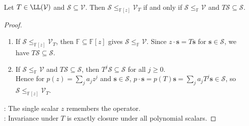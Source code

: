 \begin{theorem} \label{thm:operator-submodules-invariant-subspaces} \\
Let $T\in\LL(\mathcal{V})$ and $\mathcal{S}\subseteq\mathcal{V}$. Then $\mathcal{S}\leq_{\mathbb{F}[z]}\mathcal{V}_T$ if and only if $\mathcal{S}\leq_{\mathbb{F}}\mathcal{V}$ and $T\mathcal{S}\subseteq\mathcal{S}$.
\begin{proof}
\begin{enumerate}[label=\roman*.]
\setlength{\itemsep}{0pt}
\item[$(\Rightarrow)$] If $\mathcal{S}\leq_{\mathbb{F}[z]}\mathcal{V}_T$, then $\mathbb{F}\subseteq\mathbb{F}[z]$ gives $\mathcal{S}\leq_{\mathbb{F}}\mathcal{V}$. Since $z\cdot\mathbf{s}=T\mathbf{s}$ for $\mathbf{s}\in\mathcal{S}$, we have $T\mathcal{S}\subseteq\mathcal{S}$.
\item[$(\Leftarrow)$] If $\mathcal{S}\leq_{\mathbb{F}}\mathcal{V}$ and $T\mathcal{S}\subseteq\mathcal{S}$, then $T^j\mathcal{S}\subseteq\mathcal{S}$ for all $j\geq0$.\\
Hence for $p(z)=\sum_ja_jz^j$ and $\mathbf{s}\in\mathcal{S}$, $p\cdot\mathbf{s}=p(T)\mathbf{s}=\sum_ja_jT^j\mathbf{s}\in\mathcal{S}$, so $\mathcal{S}\leq_{\mathbb{F}[z]}\mathcal{V}_T$.
\end{enumerate}
: The single scalar $z$ remembers the operator.\\
: Invariance under $T$ is exactly closure under all polynomial scalars.
\end{proof}
\end{theorem}

